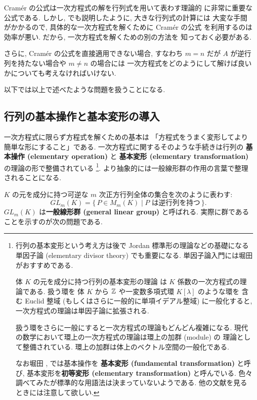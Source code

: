 \documentclass[12pt,twoside]{jarticle}
\begin{document}
Cram\'er の公式は一次方程式の解を行列式を用いて表わす理論的
に非常に重要な公式である.
しかし, でも説明したように, 大きな行列式の計算には
大変な手間がかかるので, 具体的な一次方程式を解くために Cram\'er の公式
を利用するのは効率が悪い.  だから, 一次方程式を解くための別の方法を
知っておく必要がある.

さらに, Cram\'er の公式を直接適用できない場合, 
すなわち $m=n$ だが $A$ が逆行列を持たない場合や $m\ne n$ の場合には
一次方程式をどのようにして解けば良いかについても考えなければいけない.

以下では以上で述べたような問題を扱うことになる.


\subsection{行列の基本操作と基本変形の導入}
\label{sec:elem-op-tr}

一次方程式に限らず方程式を解くための基本は
「方程式をうまく変形してより簡単な形にすること」である.  
一次方程式に関するそのような手続きは行列の
{\bf 基本操作 (elementary operation)} と
{\bf 基本変形 (elementary transformation)} の理論の形で整備されている%
\footnote{行列の基本変形という考え方は後で
  Jordan 標準形の理論などの基礎になる単因子論 (elementary divisor theory) 
  でも重要になる. 単因子論入門には堀田 \cite{10wa} がおすすめである.

  体 $K$ の元を成分に持つ行列の基本変形の理論
  は $K$ 係数の一次方程式の理論である.  扱う環を
  体 $K$ から ${\mathbb Z}$ や一変数多項式環 $K[\lambda]$ のような環を
  含む Euclid 整域 (もしくはさらに一般的に単項イデアル整域) に一般化すると, 
  一次方程式の理論は単因子論に拡張される.

  扱う環をさらに一般にすると一次方程式の理論もどんどん複雑になる.
  現代の数学において環上の一次方程式の理論は環上の加群 (module) の
  理論として整備されている.  環上の加群は体上のベクトル空間の一般化である.
  
  なお堀田 \cite{gun-kagun}, \cite{10wa} では基本操作を
  {\bf 基本変形 (fundamental transformation)} と呼び,
  基本変形を{\bf 初等変形 (elementary transformation)} と呼んでいる.
  色々調べてみたが標準的な用語法は決まっていないようである.
  他の文献を見るときには注意して欲しい.}.
より抽象的には一般線形群の作用の言葉で整理されることになる.


$K$ の元を成分に持つ可逆な $m$ 次正方行列全体の集合を次のように表わす:
\begin{equation*}
  GL_m(K) = \{\, P\in M_m(K)\mid \text{$P$ は逆行列を持つ}\,\}.
\end{equation*}
$GL_m(K)$ は{\bf 一般線形群 (general linear group)} と呼ばれる.
実際に群であることを示すのが次の問題である.
\end{document}
